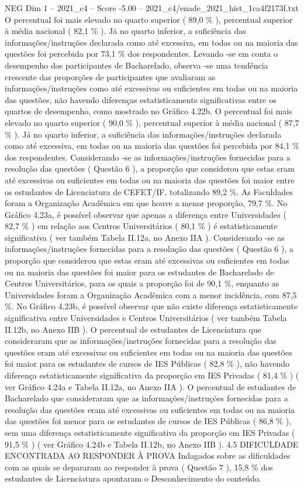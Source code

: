 \begin{textsample}{NEG Dim 1 – 2021\_c4 – Score -5.00 – 2021\_c4/enade\_2021\_hist\_1ca4f2173f.txt}
O percentual foi mais elevado no quarto superior ( 89,0 \% ), percentual superior à média nacional ( 82,1 \% ).
Já no quarto inferior, a suficiência das informações/instruções declarada como até excessiva, em todas ou na maioria das questões foi percebida por 73,1 \% dos respondentes.
Levando -se em conta o desempenho dos participantes de Bacharelado, observa -se uma tendência crescente das proporções de participantes que avaliaram as informações/instruções como até excessivas ou suficientes em todas ou na maioria das questões, não havendo diferenças estatisticamente significativas entre os quartos de desempenho, como mostrado no Gráfico 4.22b.
O percentual foi mais elevado no quarto superior ( 90,0 \% ), percentual superior à média nacional ( 87,7 \% ).
Já no quarto inferior, a suficiência das informações/instruções declarada como até excessiva, em todas ou na maioria das questões foi percebida por 84,1 \% dos respondentes.
Considerando -se as informações/instruções fornecidas para a resolução das questões ( Questão 6 ), a proporção que considerou que estas eram até excessivas ou suficientes em todas ou na maioria das questões foi maior entre os estudantes de Licenciatura de CEFET/IF, totalizando 89,2 \%.
As Faculdades foram a Organização Acadêmica em que houve a menor proporção, 79,7 \%.
No Gráfico 4.23a, é possível observar que apenas a diferença entre Universidades ( 82,7 \% ) em relação aos Centros Universitários ( 80,1 \% ) é estatisticamente significativa ( ver também Tabela II.12a, no Anexo IIA ).
Considerando -se as informações/instruções fornecidas para a resolução das questões ( Questão 6 ), a proporção que considerou que estas eram até excessivas ou suficientes em todas ou na maioria das questões foi maior para os estudantes de Bacharelado de Centros Universitários, para os quais a proporção foi de 90,1 \%, enquanto as Universidades foram a Organização Acadêmica com a menor incidência, com 87,5 \%.
No Gráfico 4.23b, é possível observar que não existe diferença estatisticamente significativa entre Universidades e Centros Universitários ( ver também Tabela II.12b, no Anexo IIB ).
O percentual de estudantes de Licenciatura que consideraram que as informações/instruções fornecidas para a resolução das questões eram até excessivas ou suficientes em todas ou na maioria das questões foi maior para os estudantes de cursos de IES Públicas ( 82,8 \% ), não havendo diferença estatisticamente significativa da proporção em IES Privadas ( 81,4 \% ) ( ver Gráfico 4.24a e Tabela II.12a, no Anexo IIA ).
O percentual de estudantes de Bacharelado que consideraram que as informações/instruções fornecidas para a resolução das questões eram até excessivas ou suficientes em todas ou na maioria das questões foi menor para os estudantes de cursos de IES Públicas ( 86,8 \% ), sem uma diferença estatisticamente significativa da proporção em IES Privadas ( 91,5 \% ) ( ver Gráfico 4.24b e Tabela II.12b, no Anexo IIB ). 4.5 DIFICULDADE ENCONTRADA AO RESPONDER À PROVA Indagados sobre as dificuldades com as quais se depararam ao responder à prova ( Questão 7 ), 15,8 \% dos estudantes de Licenciatura apontaram o Desconhecimento do conteúdo.

\end{textsample}
